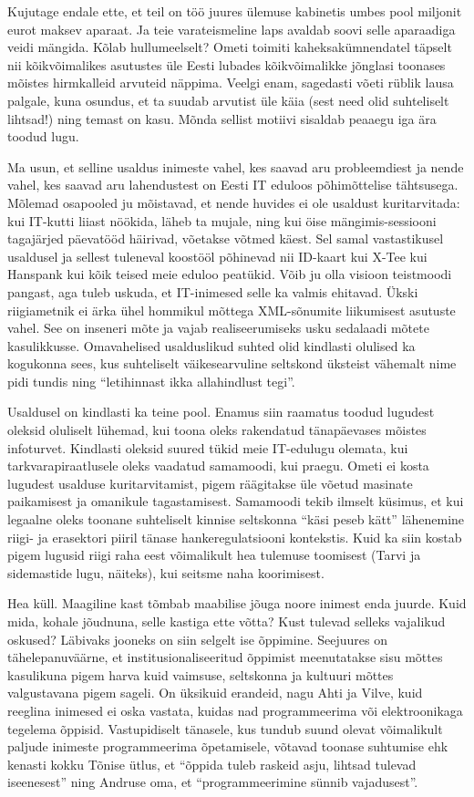 Kujutage endale ette, et teil on töö juures ülemuse kabinetis umbes pool miljonit eurot maksev aparaat. Ja teie varateismeline laps avaldab soovi selle aparaadiga veidi mängida. Kõlab hullumeelselt? Ometi toimiti kaheksakümnendatel täpselt nii kõikvõimalikes asutustes üle Eesti lubades kõikvõimalikke jõnglasi toonases mõistes hirmkalleid arvuteid näppima. Veelgi enam, sagedasti võeti rüblik lausa palgale, kuna osundus, et ta suudab arvutist üle käia (sest need olid suhteliselt lihtsad!) ning temast on kasu. Mõnda sellist motiivi sisaldab peaaegu iga ära toodud lugu.

Ma usun, et selline usaldus inimeste vahel, kes saavad aru probleemdiest ja nende vahel, kes saavad aru lahendustest on Eesti IT eduloos põhimõttelise tähtsusega. Mõlemad osapooled ju mõistavad, et nende huvides ei ole usaldust kuritarvitada: kui IT-kutti liiast nöökida, läheb ta mujale, ning kui öise mängimis-sessiooni tagajärjed päevatööd häirivad, võetakse võtmed käest. Sel samal vastastikusel usaldusel ja sellest tuleneval koostööl põhinevad nii ID-kaart kui X-Tee kui Hanspank kui kõik teised meie eduloo peatükid. Võib ju olla visioon teistmoodi pangast, aga tuleb uskuda, et IT-inimesed selle ka valmis ehitavad. Ükski riigiametnik ei ärka ühel hommikul mõttega XML-sõnumite liikumisest asutuste vahel. See on inseneri mõte ja vajab realiseerumiseks usku sedalaadi mõtete kasulikkusse. Omavahelised usalduslikud suhted olid kindlasti olulised ka kogukonna sees, kus suhteliselt väikesearvuline seltskond üksteist vähemalt nime pidi tundis ning \enquote{letihinnast ikka allahindlust tegi}. 

Usaldusel on kindlasti ka teine pool. Enamus siin raamatus toodud lugudest oleksid oluliselt lühemad, kui toona oleks rakendatud tänapäevases mõistes infoturvet. Kindlasti oleksid suured tükid meie IT-edulugu olemata, kui tarkvarapiraatlusele oleks vaadatud samamoodi, kui praegu. Ometi ei kosta lugudest usalduse kuritarvitamist, pigem räägitakse üle võetud masinate paikamisest ja omanikule tagastamisest. Samamoodi tekib ilmselt küsimus, et kui legaalne oleks toonane suhteliselt kinnise seltskonna \enquote{käsi peseb kätt} lähenemine riigi- ja erasektori piiril tänase hankeregulatsiooni kontekstis. Kuid ka siin kostab pigem lugusid riigi raha eest võimalikult hea tulemuse toomisest (Tarvi ja sidemastide lugu, näiteks), kui seitsme naha koorimisest. 

Hea küll. Maagiline kast tõmbab maabilise jõuga noore inimest enda juurde. Kuid mida, kohale jõudnuna, selle kastiga ette võtta? Kust tulevad selleks vajalikud oskused? Läbivaks jooneks on siin selgelt ise õppimine. Seejuures on tähelepanuväärne, et institusionaliseeritud õppimist meenutatakse sisu mõttes kasulikuna pigem harva kuid vaimsuse, seltskonna ja kultuuri mõttes valgustavana pigem sageli. On üksikuid erandeid, nagu Ahti ja Vilve, kuid reeglina inimesed ei oska vastata, kuidas nad programmeerima või elektroonikaga tegelema õppisid. Vastupidiselt tänasele, kus tundub suund olevat võimalikult paljude inimeste programmeerima õpetamisele, võtavad toonase suhtumise ehk kenasti kokku Tõnise ütlus, et \enquote{õppida tuleb raskeid asju, lihtsad tulevad iseenesest} ning Andruse oma, et  \enquote{programmeerimine sünnib vajadusest}. 

